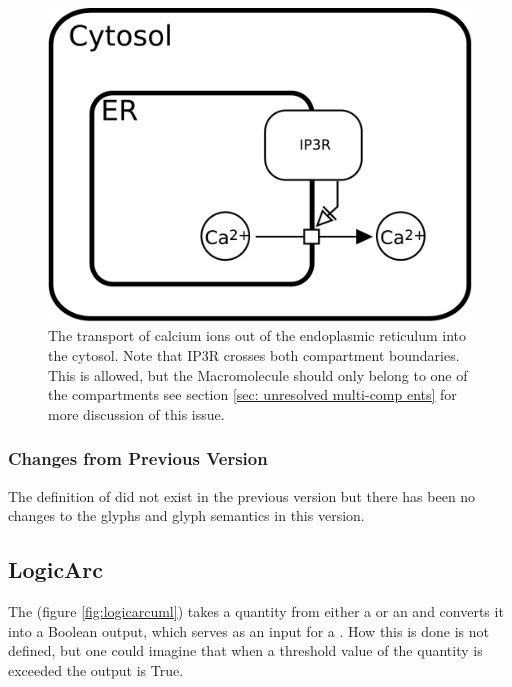 \begin{figure}[H]
  \centering
  \includegraphics[scale = 0.3]{examples/necessary_stim-transport}
  \caption{The transport of calcium ions out of the endoplasmic
    reticulum into the cytosol. Note that IP3R crosses both
    compartment boundaries. This is allowed, but the Macromolecule
    should only belong to one of the compartments see section
    \ref{sec: unresolved multi-comp ents} for more discussion of this
    issue.}
  \label{fig:necessary_stim-calcium}
\end{figure}

\subsubsection{Changes from Previous Version}

The definition of  did not exist in the
previous version but there has been no changes to the glyphs and glyph
semantics in this version.

\subsection{LogicArc}
\label{defn:LogicArc}

The  (figure \ref{fig:logicarcuml}) takes a quantity from either a
 or an  and
converts it into a Boolean output, which serves as an input for a
. How this is done is not defined, but one
could imagine that when a threshold value of the quantity is exceeded
the output is True.

